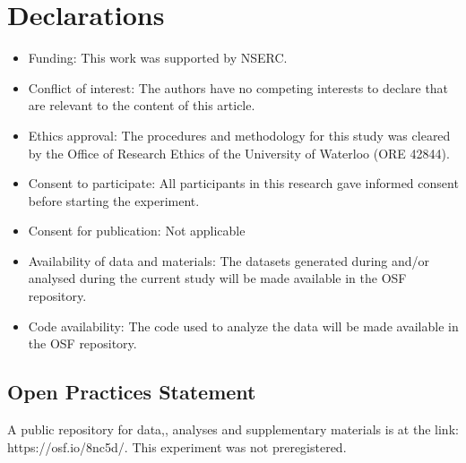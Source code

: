 \documentclass[sn-apa]{sn-jnl}\usepackage[]{graphicx}\usepackage[]{xcolor}
\begin{document}
\section{Declarations}

\begin{itemize}
\item Funding:
This work was supported by NSERC.
\item Conflict of interest:
The authors have no competing interests to declare that are relevant to the content of this article.
\item Ethics approval:
The procedures and methodology for this study was cleared by the Office of Research Ethics  of the University of Waterloo  (ORE 42844).
\item Consent to participate:
All participants in this research gave informed consent before starting the experiment.
\item Consent for publication:
Not applicable
\item Availability of data and materials:
The datasets generated during and/or analysed during the current study will be made available in the OSF repository. 
\item Code availability:
The code used to analyze the data will be made available in the OSF repository. 
\end{itemize}

\subsection{Open Practices Statement}

A public repository for data,, analyses and supplementary materials is at the link: https://osf.io/8nc5d/. This experiment was not preregistered.

\end{document}
